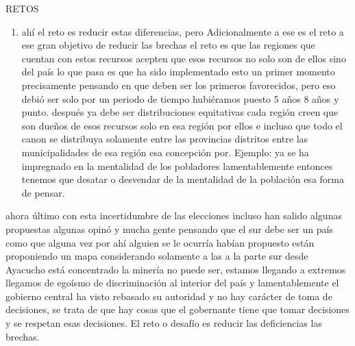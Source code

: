 \documentclass[
  a4paper,
]{article}
\providecommand{\tightlist}{%
  \setlength{\itemsep}{0pt}\setlength{\parskip}{0pt}}\usepackage{longtable,booktabs,array}
\begin{document}
RETOS

\begin{enumerate}
\def\labelenumi{\arabic{enumi}.}
\setcounter{enumi}{2}
\tightlist
\item
  ahí el reto es reducir estas diferencias, pero Adicionalmente a ese es
  el reto a ese gran objetivo de reducir las brechas el reto es que las
  regiones que cuentan con estos recursos acepten que esos recursos no
  solo son de ellos sino del país lo que pasa es que ha sido
  implementado esto un primer momento precisamente pensando en que deben
  ser los primeros favorecidos, pero eso debió ser solo por un periodo
  de tiempo hubiéramos puesto 5 años 8 años y punto. después ya debe ser
  distribuciones equitativas cada región creen que son dueños de esos
  recursos solo en esa región por ellos e incluso que todo el canon se
  distribuya solamente entre las provincias distritos entre las
  municipalidades de esa región esa concepción por. Ejemplo: ya se ha
  impregnado en la mentalidad de los pobladores lamentablemente entonces
  tenemos que desatar o desvendar de la mentalidad de la población esa
  forma de pensar.
\end{enumerate}

ahora último con esta incertidumbre de las elecciones incluso han salido
algunas propuestas algunas opinó y mucha gente pensando que el sur debe
ser un país como que alguna vez por ahí alguien se le ocurría habían
propuesto están proponiendo un mapa considerando solamente a las a la
parte sur desde Ayacucho está concentrado la minería no puede ser,
estamos llegando a extremos llegamos de egoísmo de discriminación al
interior del país y lamentablemente el gobierno central ha visto
rebasado su autoridad y no hay carácter de toma de decisiones, se trata
de que hay cosas que el gobernante tiene que tomar decisiones y se
respetan esas decisiones. El reto o desafío es reducir las deficiencias
las brechas.
\end{document}
